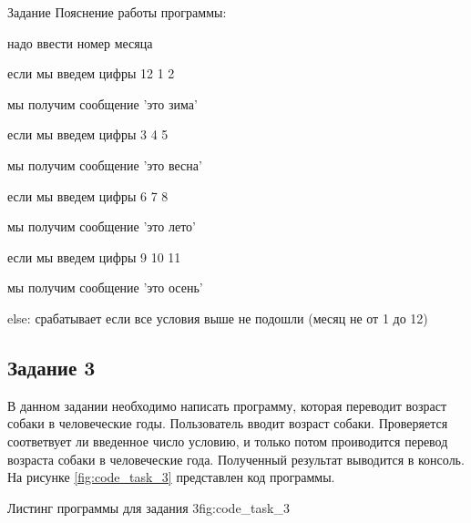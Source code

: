 \documentclass[]{vvsu}
\begin{document}
\begin{addition}{Задание}
Пояснение работы программы:
\begin{vvsu_list}
  \item надо ввести номер месяца 
  \item если мы введем цифры 12 1 2
  \item мы получим сообщение 'это зима'
  \item если мы введем цифры 3 4 5
  \item мы получим сообщение 'это весна'
  \item если мы введем цифры 6 7 8
  \item мы получим сообщение 'это лето'
  \item если мы введем цифры 9 10 11
  \item мы получим сообщение 'это осень'
  \item else: срабатывает если все условия выше не подошли (месяц не от 1 до 12)
\end{vvsu_list}

\subsection{Задание 3}

В данном задании необходимо написать программу, которая переводит возраст собаки в человеческие годы.
Пользователь вводит возраст собаки. Проверяется соответвует ли введенное число условию, и только потом проиводится перевод возраста собаки в человеческие года. Полученный результат выводится в консоль. 
На рисунке \ref{fig:code_task_3} представлен код программы.

\begin{vvsu_figure}{Листинг программы для задания 3}{fig:code_task_3}
  \begin{minipage}{.75\textwidth}
    
  \end{minipage}
\end{vvsu_figure}


\end{addition}
\end{document}
